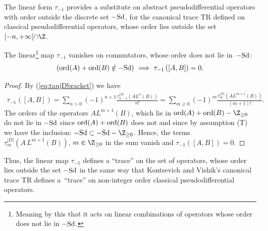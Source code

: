 The linear form $\tau_{-1}$  provides a substitute on
abstract pseudodif\/ferential operators with order outside the discrete set $-{\rm Sd}$, for the canonical trace TR
def\/ined on classical pseudodif\/ferential
operators, whose order lies outside  the set $[{-}n,+\infty[\cap \Z$.
\begin{proposition}\label{proposition7}
The linear\footnote{Meaning by this that it acts on  linear
  combinations of operators whose order does not lie in $-{\rm Sd}$.}  map
$\tau_{-1}$  vanishes on  commutators, whose order does not  lie in~$-{\rm Sd}$:
\[
\left({\rm ord}(A)+{\rm ord}(B)\notin -{\rm Sd}\right) \ \Longrightarrow \
\tau_{-1}\left([A,B]\right)=0.
\]
\end{proposition}

\begin{proof}
By (\ref{eq:taujDbracket}) we have
\begin{gather*}
\tau_{-1}([A,B]) = \sum_{n> 0} (-1)^{n+1}\frac{\tau_{n-1}^{\vert D\vert} \left(
    A L^n(B)\right)}{n!}
 =  \sum_{m\geq  0} (-1)^{m}\frac{\tau_{m}^{\vert D\vert} \left(
    A L^{m+1}(B)\right)}{(m+1)!}.
\end{gather*}
The orders of the  operators
  $  A  L^{m+1}(B)$, which lie  in ${\rm ord}(A)+ {\rm ord}(B)-\Z_{\geq 0}$  do not lie
  in $-{\rm Sd}$ since   ${\rm ord}(A)+ {\rm ord}(B)$ does not and since by assumption (T) we have the inclusion: $ -{\rm Sd}\subset
-{\rm Sd} -\Z_{\geq 0}$. Hence,
 the terms $\tau_{m}^{\vert D\vert} \left(
    A\,L^{m+1}(B)\right)$, $m\in \Z_{\geq 0}$ in the sum vanish and
$\tau_{-1}([A,B])=0$. \end{proof}

 Thus, the linear map $\tau_{-1}$ def\/ines a ``trace''  on the set of
operators, whose order  lies outside the set $-{\rm Sd}$  in the same way that
Kontsevich and Vishik's canonical trace TR
def\/ines a~``trace'' on non-integer order classical pseudodif\/ferential
operators.

